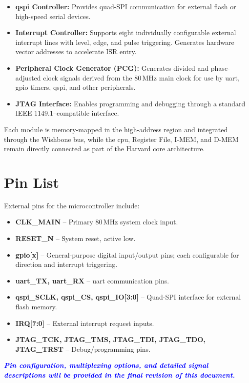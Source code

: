 \begin{itemize}
\begin{itemize}
  \item \textbf{\gls{qspi} Controller:}  
        Provides quad-SPI communication for external flash or high-speed serial devices.

  \item \textbf{Interrupt Controller:}  
        Supports eight individually configurable external interrupt lines with level, edge, and pulse 
        triggering. Generates hardware vector addresses to accelerate ISR entry.

  \item \textbf{Peripheral Clock Generator (PCG):}  
        Generates divided and phase-adjusted clock signals derived from the 80\,MHz main clock for use 
        by \gls{uart}, \gls{gpio} timers, \gls{qspi}, and other peripherals.

  \item \textbf{JTAG Interface:}  
        Enables programming and debugging through a standard IEEE 1149.1–compatible interface.
\end{itemize}

Each module is memory-mapped in the high-address region and integrated through the Wishbone bus, 
while the \gls{cpu}, Register File, \gls{I-MEM}, and \gls{D-MEM} remain directly connected as part of the \gls{Harvard} 
core architecture.


\section{Pin List} 
External pins for the microcontroller include:

\begin{itemize}
  \item \textbf{CLK\_MAIN} – Primary 80\,MHz system clock input.
  \item \textbf{RESET\_N} – System reset, active low.
  \item \textbf{\gls{gpio}[x]} – General-purpose digital input/output pins; each configurable for direction and interrupt triggering.
  \item \textbf{\gls{uart}\_TX, \gls{uart}\_RX} – \gls{uart} communication pins.
  \item \textbf{\gls{qspi}\_SCLK, \gls{qspi}\_CS, \gls{qspi}\_IO[3:0]} – Quad-SPI interface for external flash memory.
  \item \textbf{\gls{IRQ}[7:0]} – External interrupt request inputs.
  \item \textbf{JTAG\_TCK, JTAG\_TMS, JTAG\_TDI, JTAG\_TDO, JTAG\_TRST} – Debug/programming pins.
\end{itemize}

\textcolor{blue}{\textbf{\textit{Pin configuration, multiplexing options, and detailed signal descriptions will be provided in the final revision of this document.}}}

\end{itemize}
